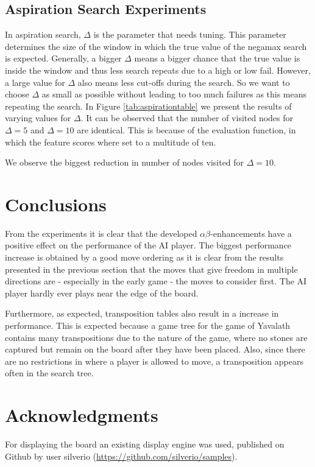 \documentclass[11pt]{article}
\begin{document}
\subsection{Aspiration Search Experiments}
\label{-subsec:aspirationsearchexperiments}
In aspiration search, $\Delta$ is the parameter that needs tuning. This parameter determines the size of the window in which the true value of the negamax search is expected. Generally, a bigger $\Delta$ means a bigger chance that the true value is inside the window and thus less search repeats due to a high or low fail. However, a large value for $\Delta$ also means less cut-offs during the search. So we want to choose $\Delta$ as small as possible without leading to too much failures as this means repeating the search. In Figure \ref{tab:aspirationtable} we present the results of varying values for $\Delta$. It can be observed that the number of visited nodes for $\Delta=5$ and $\Delta=10$ are identical. This is because of the evaluation function, in which the feature scores where set to a multitude of ten.



We observe the biggest reduction in number of nodes visited for $\Delta=10$.

\section{Conclusions}
\label{-sec:conclusions}
From the experiments it is clear that the developed $\alpha\beta$-enhancements have a positive effect on the performance of the AI player. The biggest performance increase is obtained by a good move ordering as it is clear from the results presented in the previous section that the moves that give freedom in multiple directions are - especially in the early game - the moves to consider first. The AI player hardly ever plays near the edge of the board.

Furthermore, as expected, transposition tables also result in a increase in performance. This is expected because a game tree for the game of Yavalath contains many transpositions due to the nature of the game, where no stones are captured but remain on the board after they have been placed. Also, since there are no restrictions in where a player is allowed to move, a transposition appears often in the search tree.

\section{Acknowledgments}
\label{-sec:acknowledgments}
For displaying the board an existing display engine was used, published on Github by user silverio (\url{https://github.com/silverio/samples}).

	\nocite{*}
	\printbibliography
\end{document}
